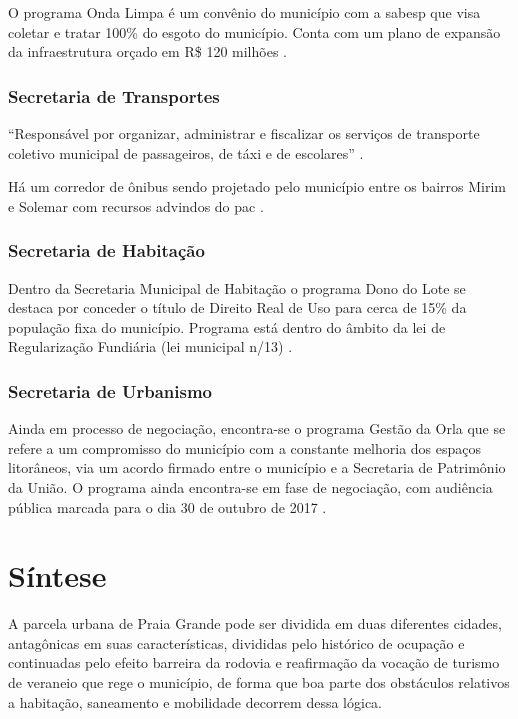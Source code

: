 	O programa Onda Limpa é um convênio do município com a \gls{sabesp} que visa coletar e tratar 100\% do esgoto do município. Conta com um plano de expansão da infraestrutura orçado em R\$ 120 milhões \cite{pmpg2017g}.
	
	\subsection{Secretaria de Transportes}
	
	``Responsável por organizar, administrar e fiscalizar os serviços de transporte coletivo municipal de passageiros, de táxi e de escolares'' \cite{pmpg2017h}.
	
	Há um corredor de ônibus sendo projetado pelo município entre os bairros Mirim e Solemar com recursos advindos do \gls{pac} \cite{pmpg2017i}.

	\subsection{Secretaria de Habitação}
	
	Dentro da Secretaria Municipal de Habitação o programa Dono do Lote se destaca por conceder o título de Direito Real de Uso para cerca de 15\% da população fixa do município. Programa está dentro do âmbito da lei de Regularização Fundiária (lei municipal n/13) \cite{pmpg2017j}.
	
	\subsection{Secretaria de Urbanismo}
	
	Ainda em processo de negociação, encontra-se o programa Gestão da Orla que se refere a um compromisso do município com a constante melhoria dos espaços litorâneos, via um acordo firmado entre o município e a Secretaria de Patrimônio da União. O programa ainda encontra-se em fase de negociação, com audiência pública marcada para o dia 30 de outubro de 2017 \cite{pmpg2017k}.

%
%

	\chapter{Síntese}
	
	A parcela urbana de Praia Grande pode ser dividida em duas diferentes cidades, antagônicas em suas características, divididas pelo histórico de ocupação e continuadas pelo efeito barreira da rodovia e reafirmação da vocação de turismo de veraneio que rege o município, de forma que boa parte dos obstáculos relativos a habitação, saneamento e mobilidade decorrem dessa lógica.
	
